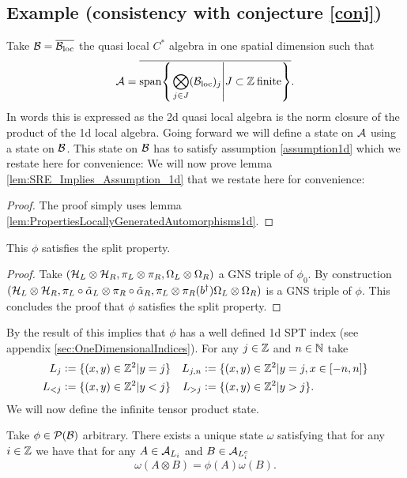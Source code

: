 \documentclass[12pt,a4paper,twoside]{article}
\numberwithin{equation}{section}
\begin{document}
\subsection{Example (consistency with conjecture \ref{conj})}\label{sec:OneTranslationDirectionExample}
Take $\BB=\overline{\BB_{\text{loc}}}$ the quasi local $C^*$ algebra in one spatial dimension such that
\begin{equation}
	\AA=\overline{\textrm{span}\left\{\left.\bigotimes_{j\in J}(\BB_{\text{loc}})_j\right|J\subset \ZZ\:\text{finite}\right\}}.
\end{equation}
In words this is expressed as the 2d quasi local algebra is the norm closure of the product of the 1d local algebra. Going forward we will define a state on $\AA$ using a state on $\BB$. This state on $\BB$ has to satisfy assumption \ref{assumption1d} which we restate here for convenience:
\assumptionOneDimensionalOne*
We will now prove lemma \ref{lem:SRE_Implies_Assumption_1d} that we restate here for convenience:
\SREImpliesAssumptionOneDimensional*
\begin{proof}
	The proof simply uses lemma \ref{lem:PropertiesLocallyGeneratedAutomorphisms1d}.
\end{proof}
\begin{lemma}\label{lem:phiExampleConsistentWithConjectureSplitProperty}
	This $\phi$ satisfies the split property.
\end{lemma}
\begin{proof}
	Take $(\HH_L\otimes\HH_R,\pi_L\otimes\pi_R,\Omega_L\otimes\Omega_R)$ a GNS triple of $\phi_0$. By construction $(\HH_L\otimes\HH_R,\pi_L\circ\tilde\alpha_L\otimes\pi_R\circ\tilde\alpha_R,\pi_L\otimes\pi_R(b^\dagger)\Omega_L\otimes\Omega_R)$ is a GNS triple of $\phi$. This concludes the proof that $\phi$ satisfies the split property.
\end{proof}
By the result of \cite{ogata2019classification} this implies that $\phi$ has a well defined 1d SPT index (see appendix \ref{sec:OneDimensionalIndices}). For any $j\in\ZZ$ and $n\in\NN$ take
\begin{align}
	L_j&\defeq \{(x,y)\in\ZZ^2|y=j\}&L_{j,n}&\defeq \{(x,y)\in\ZZ^2|y=j,x\in[-n,n]\}\\
	L_{<j}&\defeq \{(x,y)\in\ZZ^2|y<j\}&L_{>j}&\defeq \{(x,y)\in\ZZ^2|y>j\}.
\end{align}
We will now define the infinite tensor product state.
\begin{definition}\label{def:InfiniteTensorProductState}
	Take $\phi\in\PP(\BB)$ arbitrary. There exists a unique state $\omega$ satisfying that for any $i\in\ZZ$ we have that for any $A\in\AA_{L_i}$ and $B\in\AA_{L_i^c}$
	\begin{equation}
		\omega(A\otimes B)=\phi(A)\omega(B).
	\end{equation}
\end{definition}
\end{document}

